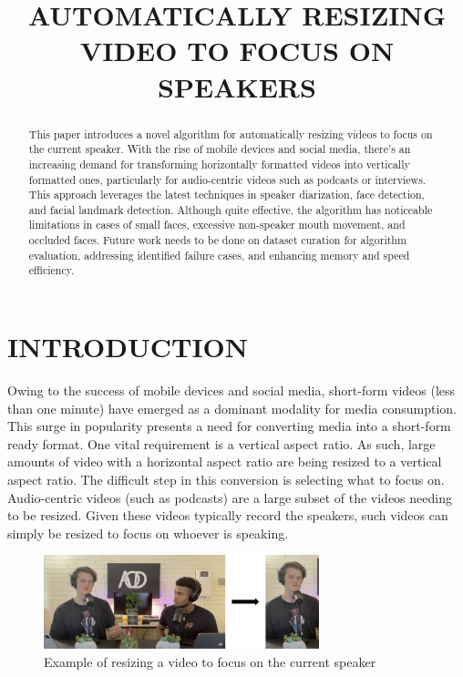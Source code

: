\documentclass{article}
\title{AUTOMATICALLY RESIZING VIDEO TO FOCUS ON SPEAKERS}
\begin{document}
%
\maketitle
%
\begin{abstract}
This paper introduces a novel algorithm for automatically resizing videos to focus on the current speaker. With the rise of mobile devices and social media, there's an increasing demand for transforming horizontally formatted videos into vertically formatted ones, particularly for audio-centric videos such as podcasts or interviews. This approach leverages the latest techniques in speaker diarization, face detection, and facial landmark detection. Although quite effective, the algorithm has noticeable limitations in cases of small faces, excessive non-speaker mouth movement, and occluded faces. Future work needs to be done on dataset curation for algorithm evaluation, addressing identified failure cases, and enhancing memory and speed efficiency.
\end{abstract}
\section{INTRODUCTION}
\label{sec:intro}

Owing to the success of mobile devices and social media, short-form videos (less than one minute) have emerged as a dominant modality for media consumption. This surge in popularity presents a need for converting media into a short-form ready format. One vital requirement is a vertical aspect ratio. As such, large amounts of video with a horizontal aspect ratio are being resized to a vertical aspect ratio. The difficult step in this conversion is selecting what to focus on. Audio-centric videos (such as podcasts) are a large subset of the videos needing to be resized. Given these videos typically record the speakers, such videos can simply be resized to focus on whoever is speaking.

\begin{figure}[htb]
    \begin{minipage}[b]{1.0\linewidth}
        \centering
        \centerline{\includegraphics[width=8cm]{horizontal-to-vertical-example.png}}
        \medskip
    \end{minipage}
    \caption{Example of resizing a video to focus on the current speaker}
    \label{fig:horizontal-to-vertical-example}
    \end{figure}
\end{document}
